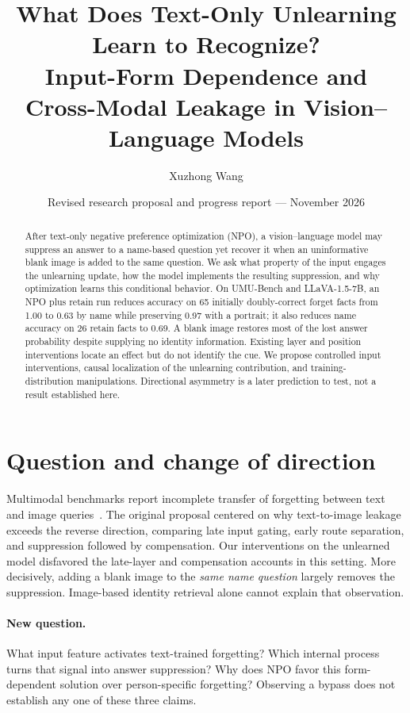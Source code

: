 \documentclass[11pt]{article}
\title{What Does Text-Only Unlearning Learn to Recognize?\\
Input-Form Dependence and Cross-Modal Leakage in Vision--Language Models}
\author{Xuzhong Wang}
\date{Revised research proposal and progress report --- November 2026}
\begin{document}
\maketitle

\begin{abstract}
After text-only negative preference optimization (NPO), a vision--language model may suppress
an answer to a name-based question yet recover it when an uninformative blank image is added
to the same question. We ask what property of the input engages the unlearning update, how
the model implements the resulting suppression, and why optimization learns this conditional
behavior. On UMU-Bench and LLaVA-1.5-7B, an NPO plus retain run reduces accuracy on 65 initially
doubly-correct forget facts from 1.00 to 0.63 by name while preserving 0.97 with a portrait;
it also reduces name accuracy on 26 retain facts to 0.69. A blank image restores most of the
lost answer probability despite supplying no identity information. Existing layer and position
interventions locate an effect but do not identify the cue. We propose controlled input
interventions, causal localization of the unlearning contribution, and training-distribution
manipulations. Directional asymmetry is a later prediction to test, not a result established here.
\end{abstract}

\section{Question and change of direction}
Multimodal benchmarks report incomplete transfer of forgetting between text and image
queries~\cite{umubench,unlinkvl,smu,idunlearn}. The original proposal centered on why
text-to-image leakage exceeds the reverse direction, comparing late input gating, early
route separation, and suppression followed by compensation. Our interventions on the
unlearned model disfavored the late-layer and compensation accounts in this setting.
More decisively, adding a blank image to the \emph{same name question} largely removes
the suppression. Image-based identity retrieval alone cannot explain that observation.

\paragraph{New question.} What input feature activates text-trained forgetting? Which
internal process turns that signal into answer suppression? Why does NPO favor this
form-dependent solution over person-specific forgetting? Observing a bypass does not
establish any one of these three claims.
\end{document}
